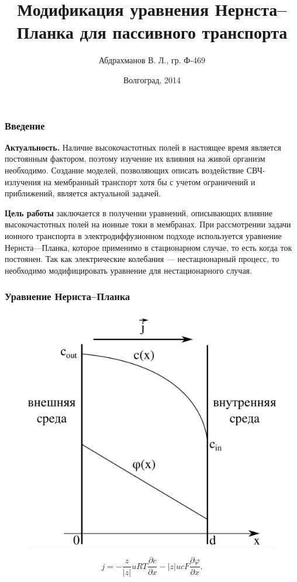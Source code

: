 \documentclass[10pt,pdf]{beamer}
\date{Волгоград, 2014}
\title{Модификация уравнения Нернста--Планка для пассивного транспорта}
\author{Абдрахманов В. Л., гр. Ф-469}
\institute{Руководитель --- профессор, д.ф.-м.н. Шеин А. Г.}
\newcommand{\pder}[2] {\frac{\partial #1}{\partial #2}}
\newcommand{\abs}[1]{\left| #1 \right|}
\renewcommand{\phi}{\varphi}
\begin{document}
  \frame{\titlepage}
  \begin{frame}
    \frametitle{Введение}

    \textbf{Актуальность.} Наличие высокочастотных полей в настоящее 
    время является постоянным фактором, поэтому изучение их влияния
    на живой организм необходимо. Создание моделей, позволяющих описать
    воздействие СВЧ-излучения на мембранный транспорт
    хотя бы с учетом ограничений и приближений, является актуальной
    задачей.
    \vspace*{2em}

    \textbf{Цель работы} заключается в получении уравнений, описывающих
    влияние высокочастотных полей на ионные токи в мембранах. При
    рассмотрении задачи ионного транспорта в электродиффузионном подходе
    используется уравнение Нернста—Планка, которое применимо в
    стационарном случае, то есть когда ток постоянен. Так как 
    электрические колебания --- нестационарный процесс, то необходимо 
    модифицировать уравнение для нестационарного случая.
\end{frame}
  \begin{frame}
    \frametitle{Уравнение Нернста--Планка}
    \begin{figure}[H]
        \center
        \includegraphics[height=.5\textheight]{membrane}
    \end{figure}
    \begin{equation}
        j = -\frac{z}{\abs{z}}uRT\pder{c}{x} -
        \abs{z}ucF\pder{\phi}{x}.
        \label{eq:nernst-plank}
    \end{equation}
  \end{frame}
\end{document}
